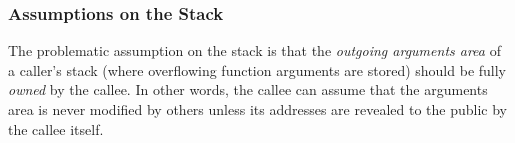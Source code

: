 

\subsubsection{Assumptions on the Stack}
\label{sec:overview-semantics-memory}
%
The problematic assumption on the stack is that the
\emph{outgoing arguments area} of a caller's stack (\ie where overflowing function
arguments are stored) should be fully \emph{owned} by the callee. In
other words, the callee can assume that the arguments area is never
modified by others unless its addresses are revealed to the public by
the callee itself.

